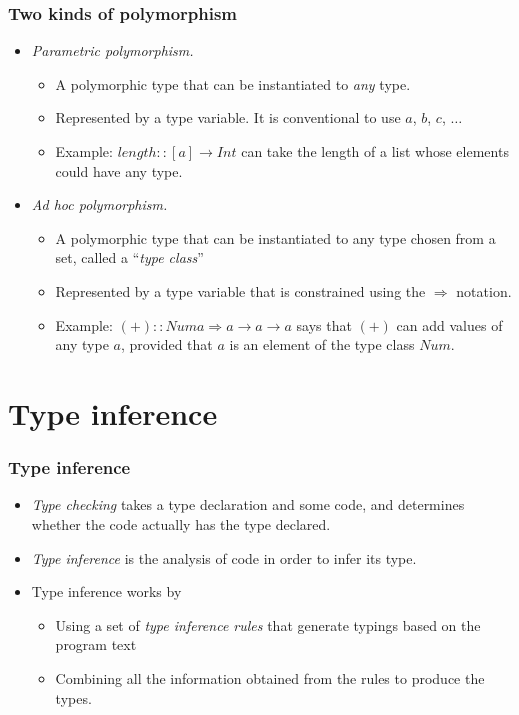 \documentclass{beamer}
\begin{document}
\begin{frame}[fragile]
\frametitle{Two kinds of polymorphism}

\begin{itemize}
\item \emph{Parametric polymorphism.}
  \begin{itemize}
  \item A polymorphic type that can be instantiated to \emph{any}
    type.
  \item Represented by a type variable.  It is conventional to use
    $a$, $b$, $c$, $\ldots$
  \item Example: $length :: [a] \rightarrow Int$ can take the length of a
    list whose elements could have any type.
  \end{itemize}

\item \emph{Ad hoc polymorphism.}
  \begin{itemize}
  \item A polymorphic type that can be instantiated to any type
    chosen from a set, called a ``\emph{type class}''
  \item Represented by a type variable that is constrained using
    the $\Rightarrow$ notation.
  \item Example: $(+) :: Num a \Rightarrow a \rightarrow a \rightarrow a$ says that $(+)$ can
    add values of any type $a$, provided that $a$ is an element of
    the type class $Num$.
  \end{itemize}
\end{itemize}

\end{frame}

\section{Type inference}
\begin{frame}[fragile]
\frametitle{Type inference}

\begin{itemize}
\item \emph{Type checking} takes a type declaration and some code,
  and determines whether the code actually has the type declared.
\item \emph{Type inference} is the analysis of code in order to
  infer its type.
\item Type inference works by
  \begin{itemize}
  \item Using a set of \emph{type inference rules} that generate
    typings based on the program text
  \item Combining all the information obtained from the rules to
    produce the types.
  \end{itemize}
\end{itemize}

\end{frame}
\end{document}

